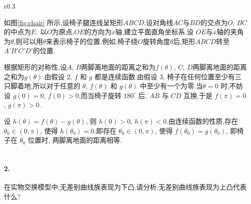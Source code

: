 \documentclass{article}
\begin{document}
\begin{wrapfigure}{r}{0.3\textwidth}

    \caption{\kaishu 椅子腿的连线呈矩形}
    \label{fig:chair}
\end{wrapfigure}


如图\ref{fig:chair} 所示,设椅子腿连线呈矩形$ABCD$.设对角线$AC$与$BD$的交点为$O$, $BC$的中点为$E$. 以$O$为原点,$OE$的方向为$x$轴,建立平面直角坐标系.设 $OE$与$x$轴的夹角为$\theta$,则可以用$\theta$来表示椅子的位置.例如,椅子绕$O$旋转角度$\theta$后,矩形$ABCD$转至$A'B'C'D'$的位置.

根据矩形的对称性,设$A$, $B$两脚离地面的距离之和为$f(\theta)$, $C$, $D$两脚离地面的距离之和为$g(\theta)$.由假设 2, $f$ 和 $g$ 都是连续函数.由假设 3, 椅子在任何位置至少有三只脚着地,所以对于任意的 $\theta$, $f(\theta)$ 和 $g(\theta)$ 中至少有一个为零.当$\theta = 0 $ 时,不妨设 $g(0) = 0$, $f(0) > 0$,而当椅子旋转 $180^\circ$ 后, $AB$ 与 $CD$ 互换,于是 $f(\pi) = 0$, $g(\pi) > 0$.

设 $h(\theta) = f(\theta) - g(\theta)$, 则 $h(0) > 0$, $h(\pi) < 0$.由连续函数的性质,存在 $\theta_0 \in (0, \pi)$, 使得 $h(\theta_0) = 0$.即存在 $\theta_0 \in (0, \pi)$, 使得 $f(\theta_0) = g(\theta_0)$, 即椅子在 $\theta_0$ 位置时, 两脚离地面的距离相等.\\\\

\paragraph{2.} 在实物交换模型中,无差别曲线族表现为下凸.请分析,无差别曲线族表现为上凸代表什么?\\

\end{document}
